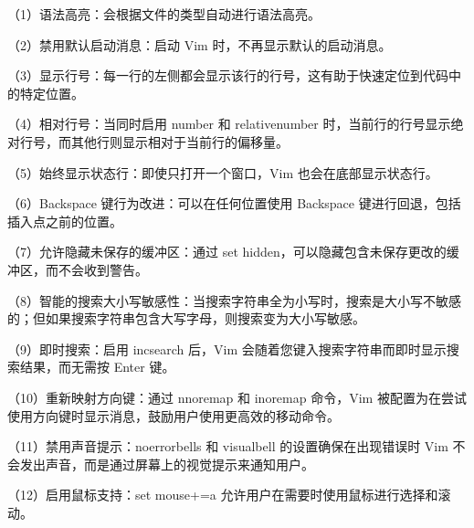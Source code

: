 \documentclass[a4paper, 12pt]{article}
\begin{document}
	（1）语法高亮：会根据文件的类型自动进行语法高亮。
	
	（2）禁用默认启动消息：启动 Vim 时，不再显示默认的启动消息。
	
	（3）显示行号：每一行的左侧都会显示该行的行号，这有助于快速定位到代码中的特定位置。
	
	（4）相对行号：当同时启用 number 和 relativenumber 时，当前行的行号显示绝对行号，而其他行则显示相对于当前行的偏移量。
	
	（5）始终显示状态行：即使只打开一个窗口，Vim 也会在底部显示状态行。
	
	（6）Backspace 键行为改进：可以在任何位置使用 Backspace 键进行回退，包括插入点之前的位置。
	
	（7）允许隐藏未保存的缓冲区：通过 set hidden，可以隐藏包含未保存更改的缓冲区，而不会收到警告。
	
	（8）智能的搜索大小写敏感性：当搜索字符串全为小写时，搜索是大小写不敏感的；但如果搜索字符串包含大写字母，则搜索变为大小写敏感。
	
	（9）即时搜索：启用 incsearch 后，Vim 会随着您键入搜索字符串而即时显示搜索结果，而无需按 Enter 键。
	
	（10）重新映射方向键：通过 nnoremap 和 inoremap 命令，Vim 被配置为在尝试使用方向键时显示消息，鼓励用户使用更高效的移动命令。
	
	（11）禁用声音提示：noerrorbells 和 visualbell 的设置确保在出现错误时 Vim 不会发出声音，而是通过屏幕上的视觉提示来通知用户。
	
	（12）启用鼠标支持：set mouse+=a 允许用户在需要时使用鼠标进行选择和滚动。
	
\end{document}
